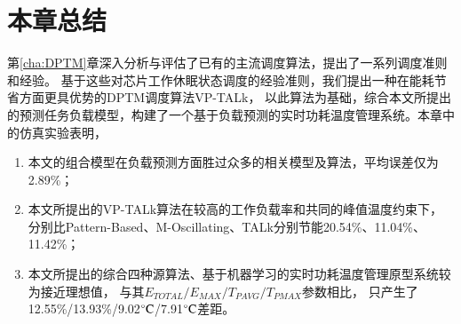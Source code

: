 \section{本章总结}
第\ref{cha:DPTM}章深入分析与评估了已有的主流调度算法，提出了一系列调度准则和经验。 基于这些对芯片工作休眠状态调度的经验准则，我们提出一种在能耗节省方面更具优势的DPTM调度算法VP-TALk， 以此算法为基础，综合本文所提出的预测任务负载模型，构建了一个基于负载预测的实时功耗温度管理系统。本章中的仿真实验表明，
\begin{enumerate}[1)]
\item 本文的组合模型在负载预测方面胜过众多的相关模型及算法，平均误差仅为2.89\%；
\item 本文所提出的VP-TALk算法在较高的工作负载率和共同的峰值温度约束下， 分别比Pattern-Based、M-Oscillating、TALk分别节能20.54\%、11.04\%、11.42\%；
\item 本文所提出的综合四种源算法、基于机器学习的实时功耗温度管理原型系统较为接近理想值， 与其$E_{TOTAL}/E_{MAX}/T_{PAVG}/T_{PMAX}$参数相比， 只产生了12.55\%/13.93\%/9.02$\celsius$/7.91$\celsius$差距。
\end{enumerate}
